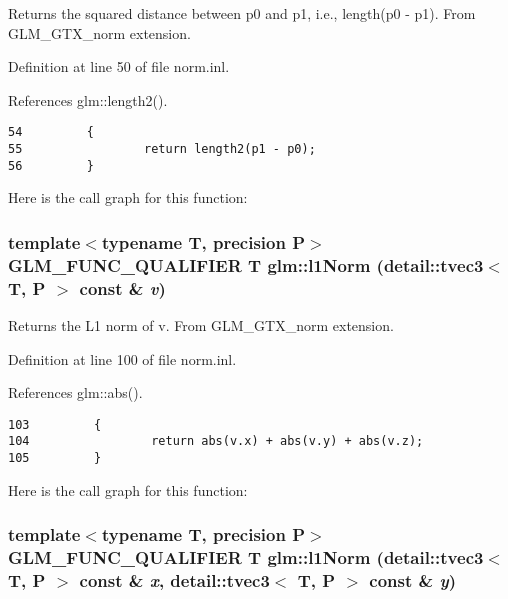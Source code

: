 Returns the squared distance between p0 and p1, i.e., length(p0 - p1). From GLM\_\-GTX\_\-norm extension. 

Definition at line 50 of file norm.inl.

References glm::length2().

\begin{Code}\begin{verbatim}54         {
55                 return length2(p1 - p0);
56         }
\end{verbatim}
\end{Code}




Here is the call graph for this function:\hypertarget{group__gtx__norm_g5a6d616a6e0340b9329d5018f04c1aca}{
\subsubsection[l1Norm]{\setlength{\rightskip}{0pt plus 5cm}template$<$typename T, precision P$>$ GLM\_\-FUNC\_\-QUALIFIER T glm::l1Norm (detail::tvec3$<$ T, P $>$ const \& {\em v})}}
\label{group__gtx__norm_g5a6d616a6e0340b9329d5018f04c1aca}


Returns the L1 norm of v. From GLM\_\-GTX\_\-norm extension. 

Definition at line 100 of file norm.inl.

References glm::abs().

\begin{Code}\begin{verbatim}103         {
104                 return abs(v.x) + abs(v.y) + abs(v.z);
105         }
\end{verbatim}
\end{Code}




Here is the call graph for this function:\hypertarget{group__gtx__norm_gf20fc187dfe66a474ecdba26e32ce4c6}{
\subsubsection[l1Norm]{\setlength{\rightskip}{0pt plus 5cm}template$<$typename T, precision P$>$ GLM\_\-FUNC\_\-QUALIFIER T glm::l1Norm (detail::tvec3$<$ T, P $>$ const \& {\em x}, \/  detail::tvec3$<$ T, P $>$ const \& {\em y})}}
\label{group__gtx__norm_gf20fc187dfe66a474ecdba26e32ce4c6}


